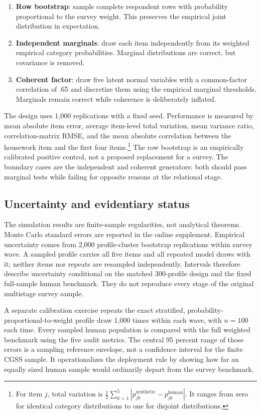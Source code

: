 \documentclass[10pt,twocolumn]{article}
\newcommand{\CGSS}{CGSS\xspace}
\begin{document}
\begin{enumerate}[leftmargin=2em]
  \item \textbf{Row bootstrap}: sample complete respondent rows with probability proportional to the
  survey weight. This preserves the empirical joint distribution in expectation.
  \item \textbf{Independent marginals}: draw each item independently from its weighted empirical
  category probabilities. Marginal distributions are correct, but covariance is removed.
  \item \textbf{Coherent factor}: draw five latent normal variables with a common-factor correlation
  of .65 and discretize them using the empirical marginal thresholds. Marginals remain correct while
  coherence is deliberately inflated.
\end{enumerate}

The design uses 1,000 replications with a fixed seed. Performance is measured by mean absolute item
error, average item-level total variation, mean variance ratio, correlation-matrix RMSE, and the mean
absolute correlation between the housework item and the first four items.\footnote{For item $j$,
total variation is $\frac{1}{2}\sum_{k=1}^{5}|p_{jk}^{\mathrm{synthetic}}-
p_{jk}^{\mathrm{human}}|$. It ranges from zero for identical category distributions to one for
disjoint distributions.} The row bootstrap is an
empirically calibrated positive control, not a proposed replacement for a survey. The boundary cases are the
independent and coherent generators: both should pass marginal tests while failing for opposite
reasons at the relational stage.

\subsection{Uncertainty and evidentiary status}

The simulation results are finite-sample regularities, not analytical theorems. Monte Carlo standard
errors are reported in the online supplement. Empirical uncertainty comes from 2,000
profile-cluster bootstrap replications within survey wave. A sampled profile carries all five items
and all repeated model draws with it; neither items nor repeats are resampled independently.
Intervals therefore describe uncertainty conditional on the matched 300-profile design and the
fixed full-sample human benchmark. They do not reproduce every stage of the original multistage
survey sample.

A separate calibration exercise repeats the exact stratified, probability-proportional-to-weight
profile draw 1,000 times within each wave, with $n=100$ each time. Every sampled human population is
compared with the full weighted benchmark using the five audit metrics. The central 95 percent range
of those errors is a sampling reference envelope, not a confidence interval for the finite \CGSS
sample. It operationalizes the deployment rule by showing how far an equally sized human sample
would ordinarily depart from the survey benchmark.
\end{document}
